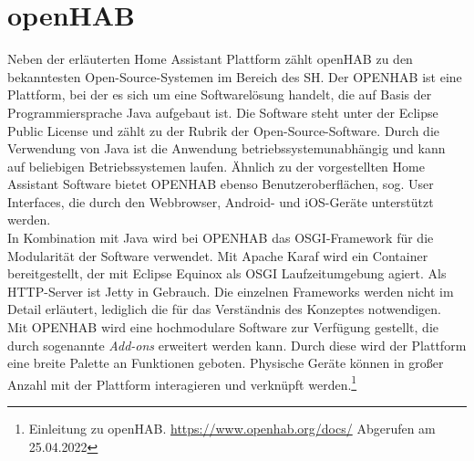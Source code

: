 \section{openHAB}
\label{sec:openhab} 
    Neben der erläuterten Home Assistant Plattform zählt openHAB zu den bekanntesten Open-Source-Systemen im 
    Bereich des \acs{SH}. Der \ac{OPENHAB} ist eine Plattform, bei der es sich um eine 
    Softwarelösung handelt, die auf Basis der Programmiersprache Java aufgebaut ist. Die Software steht unter 
    der Eclipse Public License und zählt zu der Rubrik der Open-Source-Software. Durch die Verwendung 
    von Java ist die Anwendung betriebssystemunabhängig und kann auf beliebigen Betriebssystemen laufen. 
    Ähnlich zu der vorgestellten Home Assistant Software bietet \acs{OPENHAB} ebenso Benutzeroberflächen, sog. User Interfaces, die durch 
    den Webbrowser, Android- und iOS-Geräte unterstützt werden. 
    \\
    \linebreak
    In Kombination mit Java wird bei \acs{OPENHAB} das \ac{OSGI}-Framework für die Modularität der Software verwendet. Mit Apache 
    Karaf wird ein Container bereitgestellt, der mit Eclipse Equinox als \acs{OSGI} Laufzeitumgebung agiert. Als 
    \acs{HTTP}-Server ist Jetty in Gebrauch. Die einzelnen Frameworks werden nicht im Detail erläutert, lediglich die für das 
    Verständnis des Konzeptes notwendigen.
    \\
    \linebreak
    Mit \acs{OPENHAB} wird eine hochmodulare Software zur Verfügung gestellt, die durch sogenannte \textit{Add-ons} erweitert 
    werden kann. Durch diese wird der Plattform eine breite Palette an Funktionen geboten. Physische Geräte können in 
    großer Anzahl mit der Plattform interagieren und verknüpft werden.\footnote{Einleitung zu openHAB. \url{https://www.openhab.org/docs/} Abgerufen am 25.04.2022}
